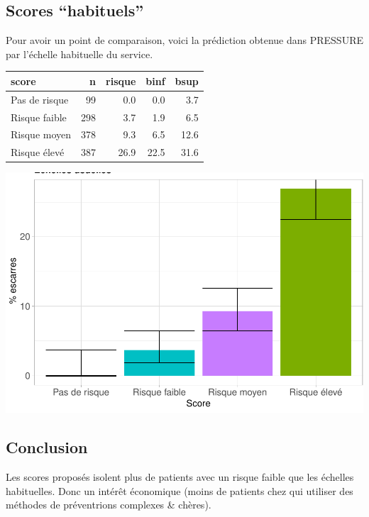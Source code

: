 \documentclass[]{article}
\begin{document}
\hypertarget{scores-habituels}{%
\subsection{Scores ``habituels''}\label{scores-habituels}}

Pour avoir un point de comparaison, voici la prédiction obtenue dans
PRESSURE par l'échelle habituelle du service.

\begin{tabular}{lrrrr}
\toprule
score & n & risque & binf & bsup\\
\midrule
Pas de risque & 99 & 0.0 & 0.0 & 3.7\\
Risque faible & 298 & 3.7 & 1.9 & 6.5\\
Risque moyen & 378 & 9.3 & 6.5 & 12.6\\
Risque élevé & 387 & 26.9 & 22.5 & 31.6\\
\bottomrule
\end{tabular}

\includegraphics{book_escarre_files/figure-latex/schab-1.pdf}

\hypertarget{conclusion}{%
\subsection{Conclusion}\label{conclusion}}

Les scores proposés isolent plus de patients avec un risque faible que
les échelles habituelles. Donc un intérêt économique (moins de patients
chez qui utiliser des méthodes de préventrions complexes \& chères).
\end{document}
